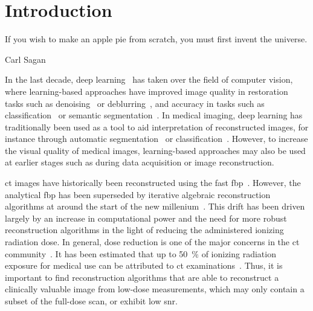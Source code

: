 \documentclass[../ml-tct.tex]{subfiles}
\begin{document}
\chapter{Introduction}
\epigraph{If you wish to make an apple pie from scratch, you must first invent the universe.}{Carl Sagan}
In the last decade, deep learning~\cite{goodfellow_deeplearning_2016} has taken over the field of computer vision, where learning-based approaches have improved image quality in restoration tasks such as denoising~\cite{zhang_beyond_2017} or deblurring~\cite{nah_deep_2017}, and accuracy in tasks such as classification~\cite{krizhevsky_imagenet_2017} or semantic segmentation~\cite{chen_deeplab_2018}.
In medical imaging, deep learning has traditionally been used as a tool to aid interpretation of reconstructed images, for instance through automatic segmentation~\cite{kamnitsas_efficient_2017} or classification~\cite{liu_detecting_2017}.
However, to increase the visual quality of medical images, learning-based approaches may also be used at earlier stages such as during data acquisition or image reconstruction.

\gls{ct} images have historically been reconstructed using the fast \gls{fbp}~\cite{buzug_computed_2008}.
However, the analytical \gls{fbp} has been superseded by iterative algebraic reconstruction algorithms at around the start of the new millenium~\cite{saad_iterative_2000,wang_vannier_cheng_1999}.
This drift has been driven largely by an increase in computational power and the need for more robust reconstruction algorithms in the light of reducing the administered ionizing radiation dose.
In general, dose reduction is one of the major concerns in the \gls{ct} community~\cite{chen_sparsect_2019,yu_radiation_2009}.
It has been estimated that up to \SI{50}{\percent} of ionizing radiation exposure for medical use can be attributed to \gls{ct} examinations~\cite{ncrp_ionizing_2009}.
Thus, it is important to find reconstruction algorithms that are able to reconstruct a clinically valuable image from low-dose measurements, which may only contain a subset of the full-dose scan, or exhibit low \gls{snr}.
\end{document}
